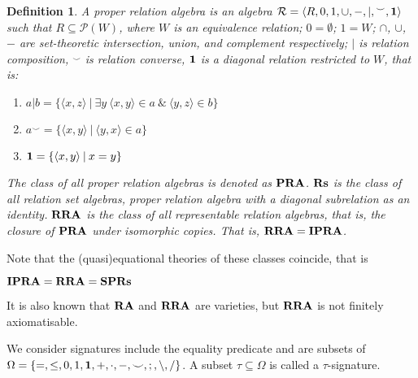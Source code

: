 \documentclass[a4paper]{article}
\theoremstyle{defin}
\newtheorem{defin}{Definition}
\theoremstyle{theorem}
\theoremstyle{prop}
\theoremstyle{lemma}
\theoremstyle{ex}
\theoremstyle{col}
\theoremstyle{claim}
\begin{document}
\begin{defin}
    A proper relation algebra is an algebra $\mathcal{R} = \langle R, 0, 1, \cup, -, |, {}^{\smile}, {\bf 1 }\rangle$ such that $R \subseteq \mathcal{P}(W)$, where $W$ is an equivalence relation; $0 = \emptyset$; $1 = W$; $\cap$, $\cup$, $-$ are set-theoretic intersection, union, and
    complement respectively; $|$ is relation composition, ${}^{\smile}$ is relation converse, ${\bf 1}$ is a
    diagonal relation restricted to $W$, that is:
    \begin{enumerate}
    \item $a | b = \{ \langle x, z \rangle \: | \: \exists y \: \langle x, y \rangle \in a \: \& \: \langle y, z \rangle \in b \}$
    \item $a^{\smile} = \{ \langle x, y \rangle \: | \: \langle y, x \rangle \in a \}$
    \item ${\bf 1} = \{ \langle x, y \rangle \: | \: x = y \}$
    \end{enumerate}
      The class of all proper relation algebras is denoted as ${\bf PRA}$. ${\bf Rs}$ is the class of all relation set algebras, proper relation algebra with a diagonal subrelation as an identity. ${\bf RRA}$ is the class of all representable relation algebras, that is, the closure of ${\bf PRA}$ under isomorphic copies. That is,
      ${\bf RRA} = {\bf IPRA}$.
\end{defin}
Note that the (quasi)equational theories of these classes coincide, that is
\begin{center}
  ${\bf IPRA} = {\bf RRA} = {\bf SP}{\bf Rs}$
\end{center}
It is also known that ${\bf RA}$ and ${\bf RRA}$ are varieties, but ${\bf RRA}$ is not finitely axiomatisable.

We consider signatures include the equality predicate and are subsets of
$\Omega = \{ =, \leq, 0, 1, {\bf 1}, +, \cdot, -, \smile, ;, \setminus, / \}$. A subset $\tau \subseteq \Omega$ is called a $\tau$-signature.
\end{document}
